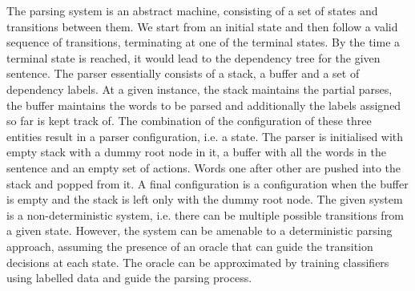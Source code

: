 \documentclass[11pt]{article}
\begin{document}

The parsing system  is an abstract machine, consisting of a set of states and transitions between them. We start from an initial state and then follow a valid sequence of transitions, terminating at one of the terminal states. By the time a terminal state is reached, it would lead to the dependency tree for the given sentence.  The parser essentially consists of a stack, a buffer and a set of dependency labels. At  a given instance, the stack maintains the partial parses, the buffer maintains the words to be parsed and additionally the labels assigned so far is kept track of.  The combination of the configuration of these three entities result in a parser configuration, i.e. a state.  The parser is initialised with empty stack with a dummy root node in it, a buffer with all the words in the sentence and an empty set of actions. Words one after other are pushed into the stack and popped from it. A final configuration is a configuration when the buffer is empty and the stack is left only with the dummy root node. The given system is a non-deterministic system, i.e. there can be multiple possible transitions from a given state. However, the system can be amenable to a deterministic parsing approach, assuming the presence of an oracle that can guide the transition decisions at each state.  The oracle can be approximated by training classifiers using labelled data \cite{kubler2009dependency} and guide the parsing process. 
\end{document}
